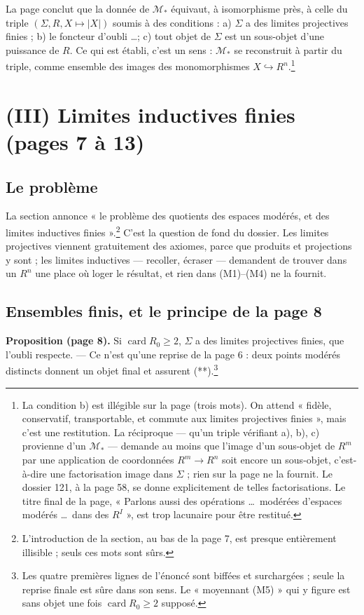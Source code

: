 \documentclass[11pt,a4paper]{article}
\begin{document}
La page conclut que la donnée de $\mathcal{M}_*$ équivaut, à isomorphisme près,
à celle du triple $(\Sigma, R, X \mapsto |X|)$ soumis à des conditions :
a) $\Sigma$ a des limites projectives finies ; b) le foncteur d'oubli
\ldots ; c) tout objet de $\Sigma$ est un sous-objet d'une puissance de $R$.
Ce qui est établi, c'est un sens : $\mathcal{M}_*$ se reconstruit à partir du
triple, comme ensemble des images des monomorphismes $X \hookrightarrow
R^n$.\footnote{La condition b) est illégible sur la page (trois mots). On
attend « fidèle, conservatif, transportable, et commute aux limites
projectives finies », mais c'est une restitution. La réciproque — qu'un triple
vérifiant a), b), c) provienne d'un $\mathcal{M}_*$ — demande au moins que
l'image d'un sous-objet de $R^m$ par une application de coordonnées $R^m \to
R^n$ soit encore un sous-objet, c'est-à-dire une factorisation image dans
$\Sigma$ ; rien sur la page ne la fournit. Le dossier 121, à la page 58, se donne
explicitement de telles factorisations. Le titre final de la page, « Parlons aussi des opérations
\ldots\ modérées d'espaces modérés \ldots\ dans des $R^I$ », est trop lacunaire
pour être restitué.}

\section*{(III) Limites inductives finies (pages 7 à 13)}

\subsection*{Le problème}

La section annonce « le problème des quotients des espaces modérés, et des
limites inductives finies ».\footnote{L'introduction de la section, au bas
de la page 7, est presque entièrement illisible ; seuls ces mots sont sûrs.}
C'est la question de fond du dossier. Les limites projectives viennent
gratuitement des axiomes, parce que produits et projections y sont ; les
limites inductives — recoller, écraser — demandent de trouver dans un $R^n$ une
place où loger le résultat, et rien dans (M1)--(M4) ne la fournit.

\subsection*{Ensembles finis, et le principe de la page 8}

\textbf{Proposition (page 8).} Si $\operatorname{card} R_0 \geqslant 2$,
$\Sigma$ a des limites projectives finies, que l'oubli respecte. — Ce n'est
qu'une reprise de la page 6 : deux points modérés distincts donnent un objet
final et assurent (**).\footnote{Les quatre premières lignes de l'énoncé sont
biffées et surchargées ; seule la reprise finale est sûre dans son sens. Le
« moyennant (M5) » qui y figure est sans objet une fois $\operatorname{card}
R_0 \geqslant 2$ supposé.}
\end{document}
